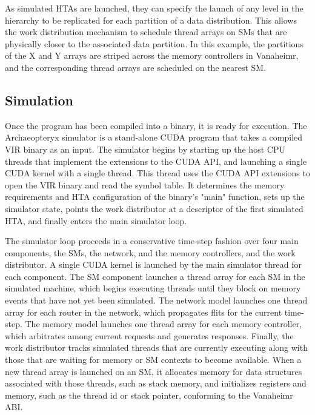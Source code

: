 \documentclass[conference, 10pt]{IEEEtran}
\begin{document}
As simulated HTAs are launched, they can specify the launch of any level in the
hierarchy to be replicated for each partition of a data distribution.  This
allows the work distribution mechanism to schedule thread arrays on SMs that
are physically closer to the associated data partition.  In this example, the
partitions of the X and Y arrays are striped across the memory controllers in
Vanaheimr, and the corresponding thread arrays are scheduled on the nearest SM.

\subsection{Simulation}

Once the program has been compiled into a binary, it is ready for execution. 
The Archaeopteryx simulator is a stand-alone CUDA program that takes a compiled
VIR binary as an input.  The simulator begins by starting up the host CPU
threads that implement the extensions to the CUDA API, and launching a single
CUDA kernel with a single thread.   This thread uses the CUDA API extensions to
open the VIR binary and read the symbol table.  It determines the memory
requirements and HTA configuration of the binary's "main" function, sets up the
simulator state, points the work distributor at a descriptor of the first
simulated HTA, and finally enters the main simulator loop.  

The simulator loop proceeds in a conservative
time-step fashion over four main components, the SMs, the network, and the
memory controllers, and the work distributor.  A single CUDA kernel is launched
by the main simulator thread for each component.  The SM component launches a
thread array for each SM in the simulated machine, which begins executing
threads until they block on memory events that have not yet been simulated. 
The network model launches one thread array for each router in the network,
which propagates flits for the current time-step.  The memory model launches one
thread array for each memory controller, which arbitrates among current requests
and generates responses.  Finally, the work distributor tracks simulated threads
that are currently executing along with those that are waiting for memory or
SM contexts to become available.  When a new thread array is launched on an SM,
it allocates memory for data structures associated with those threads, such as
stack memory, and initializes registers and memory, such as the thread id or
stack pointer, conforming to the Vanaheimr ABI.
\end{document}
